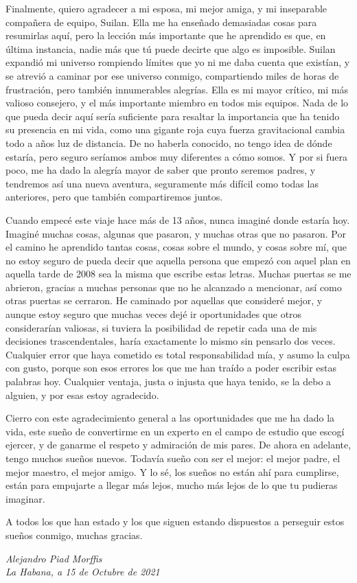 Finalmente, quiero agradecer a mi esposa, mi mejor amiga, y mi inseparable compañera de equipo, Suilan.
Ella me ha enseñado demasiadas cosas para resumirlas aquí, pero la lección más importante que he aprendido es que, en última instancia, nadie más que tú puede decirte que algo es imposible.
Suilan expandió mi universo rompiendo límites que yo ni me daba cuenta que existían, y se atrevió a caminar por ese universo conmigo, compartiendo miles de horas de frustración, pero también innumerables alegrías.
Ella es mi mayor crítico, mi más valioso consejero, y el más importante miembro en todos mis equipos.
Nada de lo que pueda decir aquí sería suficiente para resaltar la importancia que ha tenido su presencia en mi vida, como una gigante roja cuya fuerza gravitacional cambia todo a años luz de distancia.
De no haberla conocido, no tengo idea de dónde estaría, pero seguro seríamos ambos muy diferentes a cómo somos.
Y por si fuera poco, me ha dado la alegría mayor de saber que pronto seremos padres, y tendremos así una nueva aventura, seguramente más difícil como todas las anteriores, pero que también compartiremos juntos.

Cuando empecé este viaje hace más de 13 años, nunca imaginé donde estaría hoy.
Imaginé muchas cosas, algunas que pasaron, y muchas otras que no pasaron.
Por el camino he aprendido tantas cosas, cosas sobre el mundo, y cosas sobre mí, que no estoy seguro de pueda decir que aquella persona que empezó con aquel plan en aquella tarde de 2008 sea la misma que escribe estas letras.
Muchas puertas se me abrieron, gracias a muchas personas que no he alcanzado a mencionar, así como otras puertas se cerraron.
He caminado por aquellas que consideré mejor, y aunque estoy seguro que muchas veces dejé ir oportunidades que otros considerarían valiosas, si tuviera la posibilidad de repetir cada una de mis decisiones trascendentales, haría exactamente lo mismo sin pensarlo dos veces.
Cualquier error que haya cometido es total responsabilidad mía, y asumo la culpa con gusto, porque son esos errores los que me han traído a poder escribir estas palabras hoy.
Cualquier ventaja, justa o injusta que haya tenido, se la debo a alguien, y por esas estoy agradecido.

Cierro con este agradecimiento general a las oportunidades que me ha dado la vida, este sueño de convertirme en un experto en el campo de estudio que escogí ejercer, y de ganarme el respeto y admiración de mis pares.
De ahora en adelante, tengo muchos sueños nuevos.
Todavía sueño con ser el mejor: el mejor padre, el mejor maestro, el mejor amigo.
Y lo sé, los sueños no están ahí para cumplirse, están para empujarte a llegar más lejos, mucho más lejos de lo que tu pudieras imaginar.

A todos los que han estado y los que siguen estando dispuestos a perseguir estos sueños conmigo, muchas gracias.

\vspace{1cm}
\begin{flushright}
{\it Alejandro Piad Morffis}\\
{\it La Habana, a 15 de Octubre de 2021}
\end{flushright}

